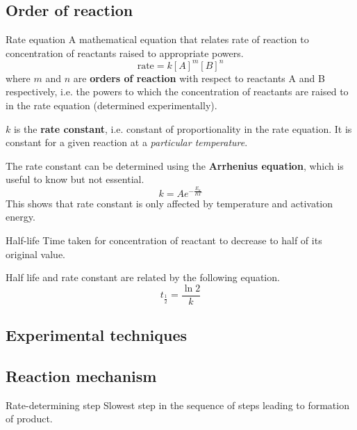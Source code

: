 \subsection{Order of reaction}


\begin{defn}{Rate equation}{}
A mathematical equation that relates rate of reaction to concentration of reactants raised to appropriate powers.
\begin{equation}
\text{rate} = k[A]^m[B]^n
\end{equation}
where $m$ and $n$ are \textbf{orders of reaction} with respect to reactants A and B respectively, i.e. the powers to which the concentration of reactants are raised to in the rate equation (determined experimentally).

$k$ is the \textbf{rate constant}, i.e. constant of proportionality in the rate equation. It is constant for a given reaction at a \emph{particular temperature}.
\end{defn}

\begin{remark}
The rate constant can be determined using the \textbf{Arrhenius equation}, which is useful to know but not essential.
\begin{equation}
k = Ae^{-\frac{E_a}{RT}}
\end{equation}
This shows that rate constant is only affected by temperature and activation energy.
\end{remark}

\begin{defn}{Half-life}{}
Time taken for concentration of reactant to decrease to half of its original value.
\end{defn}

Half life and rate constant are related by the following equation.
\begin{equation}
t_\frac{1}{2} = \frac{\ln 2}{k}
\end{equation}

\subsection{Experimental techniques}

\subsection{Reaction mechanism}
\begin{defn}{Rate-determining step}{}
Slowest step in the sequence of steps leading to formation of product.
\end{defn}

